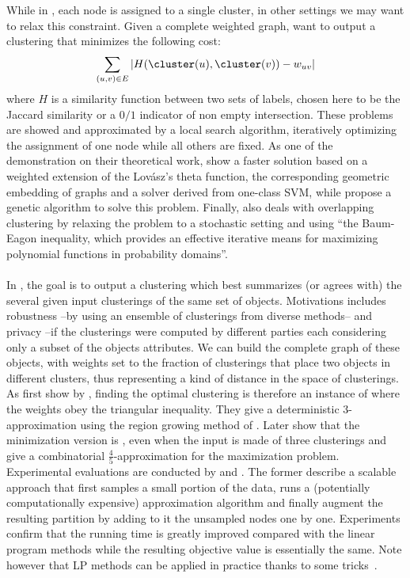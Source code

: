 While in \pcc{}, each node is assigned to a single cluster, in other settings we may want to relax
this constraint. Given a complete weighted graph, \textcite{Bonchi2012} want to output a clustering
\cluster{} that minimizes the following cost: \[ \sum_{(u,v)\in E} \left| H(\cluster(u),
\cluster(v)) - w_{uv}\right|\] where $H$ is a similarity function between two sets of labels, chosen
here to be the Jaccard similarity or a $0/1$ indicator of non empty intersection. These problems are
showed \NPc{} and approximated by a local search algorithm, iteratively optimizing the assignment of
one node while all others are fixed. As one of the demonstration on their theoretical work,
\textcite{WeightedTheta15} show a faster solution based on a weighted extension of the Lovász's
theta function, the corresponding geometric embedding of graphs and a solver derived from one-class
SVM, while \textcite{GeneticOCC14} propose a genetic algorithm to solve this problem. Finally,
\Textcite{StochasticCC13} also deals with overlapping clustering by relaxing the problem to a
stochastic setting and using \enquote{the Baum-Eagon inequality, which provides an effective
iterative means for maximizing polynomial functions in probability domains}.

\paragraph{\msc{}} 

In \msc{}, the goal is to output a clustering which best summarizes (or agrees with) the several
given input clusterings of the same set of objects.  Motivations includes robustness --by using an
ensemble of clusterings from diverse methods-- and privacy --if the clusterings were computed by
different parties each considering only a subset of the objects attributes. We can build the
complete graph of these objects, with weights set to the fraction of clusterings that place two
objects in different clusters, thus representing a kind of distance in the space of clusterings.  As
first show by \textcite{Gionis2007}, finding the optimal clustering is therefore an instance of
\pcc{} where the weights obey the triangular inequality. They give a deterministic $3$-approximation
using the region growing method of \textcite{Charikar2003}. Later \textcite{Bonizzoni2008} show that
the minimization version is \APXh{}, even when the input is made of three clusterings and give a
combinatorial $\frac{4}{5}$-approximation for the maximization problem. Experimental evaluations are
conducted by \textcite{Bertolacci07} and \textcite{Filkov08}. The former describe a scalable
approach that first samples a small portion of the data, runs a (potentially computationally
expensive) approximation algorithm and finally augment the resulting partition by adding to it the
unsampled nodes one by one.  Experiments confirm that the running time is greatly improved compared
with the linear program methods while the resulting objective value is essentially the same. Note
however that LP methods can be applied in practice thanks to some tricks~\autocite{ConsensusLP10}.


